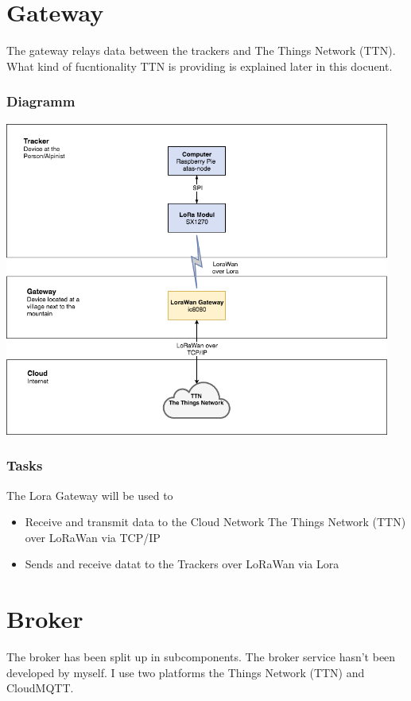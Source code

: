\documentclass[a4paper,11pt, oneside]{report}
\theoremstyle{definition}
\begin{document}
\newpage
\section{Gateway}
The gateway relays data between the trackers and The Things Network (TTN). What kind of fucntionality TTN is providing is explained later in this docuent.

\subsubsection{Diagramm}
\includegraphics[width=0.95\textwidth]{img/ATAS_SystemOverview_Detail_Gateway.png}

\subsubsection{Tasks}
The Lora Gateway will be used to
\begin{itemize}
\item Receive and transmit data to the Cloud Network The Things Network (TTN) over LoRaWan via TCP/IP
\item Sends and receive datat to the Trackers over LoRaWan via Lora
\end{itemize}

\newpage

\section{Broker}
The broker has been split up in subcomponents. The broker service hasn't been developed by myself. I use two platforms the Things Network (TTN) and CloudMQTT.
\end{document}
